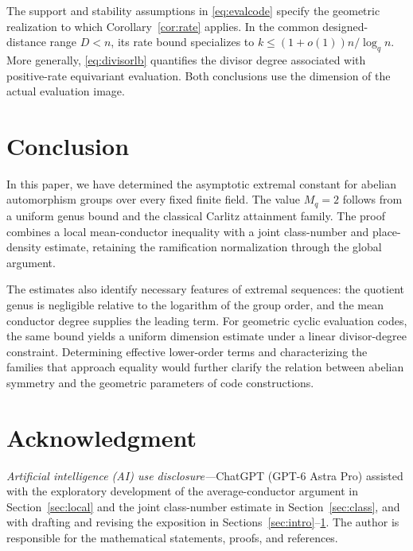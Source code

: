 \documentclass[12pt,onecolumn,draftclsnofoot,letterpaper]{IEEEtran}
\theoremstyle{remark}
\begin{document}
The support and stability assumptions in \eqref{eq:evalcode} specify the geometric realization to which Corollary~\ref{cor:rate} applies. In the common designed-distance range $D<n$, its rate bound specializes to $k\le(1+o(1))n/\log_qn$. More generally, \eqref{eq:divisorlb} quantifies the divisor degree associated with positive-rate equivariant evaluation. Both conclusions use the dimension of the actual evaluation image.

\section{Conclusion}\label{sec:conclusion}
In this paper, we have determined the asymptotic extremal constant for abelian automorphism groups over every fixed finite field. The value $M_q=2$ follows from a uniform genus bound and the classical Carlitz attainment family. The proof combines a local mean-conductor inequality with a joint class-number and place-density estimate, retaining the ramification normalization through the global argument.

The estimates also identify necessary features of extremal sequences: the quotient genus is negligible relative to the logarithm of the group order, and the mean conductor degree supplies the leading term. For geometric cyclic evaluation codes, the same bound yields a uniform dimension estimate under a linear divisor-degree constraint. Determining effective lower-order terms and characterizing the families that approach equality would further clarify the relation between abelian symmetry and the geometric parameters of code constructions.

\section*{Acknowledgment}
\emph{Artificial intelligence (AI) use disclosure---}ChatGPT (GPT-6 Astra Pro) assisted with the exploratory development of the average-conductor argument in Section~\ref{sec:local} and the joint class-number estimate in Section~\ref{sec:class}, and with drafting and revising the exposition in Sections~\ref{sec:intro}--\ref{sec:conclusion}. The author is responsible for the mathematical statements, proofs, and references.
\end{document}
